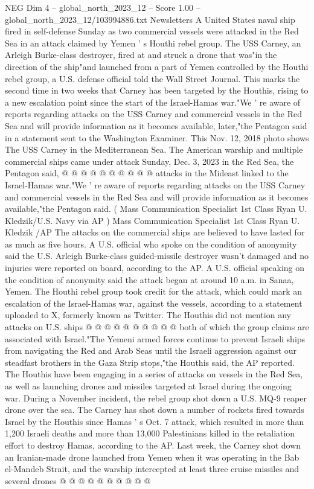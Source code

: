 \begin{textsample}{NEG Dim 4 – global\_north\_2023\_12 – Score 1.00 – global\_north\_2023\_12/103994886.txt}  \label{ex:f4_neg_160}
Newsletters A United States naval ship fired in self-defense Sunday as two commercial vessels were attacked in the Red Sea in an attack claimed by Yemen ' s Houthi rebel group.
The USS Carney, an Arleigh Burke-class destroyer, fired at and struck a drone that was"in the direction of the ship"and launched from a part of Yemen controlled by the Houthi rebel group, a U.S. defense official told the Wall Street Journal.
This marks the second time in two weeks that Carney has been targeted by the Houthis, rising to a new escalation point since the start of the Israel-Hamas war."We ' re aware of reports regarding attacks on the USS Carney and commercial vessels in the Red Sea and will provide information as it becomes available, later,"the Pentagon said in a statement sent to the Washington Examiner.
This Nov. 12, 2018 photo shows The USS Carney in the Mediterranean Sea.
The American warship and multiple commercial ships came under attack Sunday, Dec. 3, 2023 in the Red Sea, the Pentagon said, @ @ @ @ @ @ @ @ @ @ attacks in the Mideast linked to the Israel-Hamas war."We ' re aware of reports regarding attacks on the USS Carney and commercial vessels in the Red Sea and will provide information as it becomes available,"the Pentagon said. ( Mass Communication Specialist 1st Class Ryan U.
Kledzik/U.S.
Navy via AP ) Mass Communication Specialist 1st Class Ryan U.
Kledzik /AP The attacks on the commercial ships are believed to have lasted for as much as five hours.
A U.S. official who spoke on the condition of anonymity said the U.S.
Arleigh Burke-class guided-missile destroyer wasn't damaged and no injuries were reported on board, according to the AP.
A U.S. official speaking on the condition of anonymity said the attack began at around 10 a.m. in Sanaa, Yemen.
The Houthi rebel group took credit for the attack, which could mark an escalation of the Israel-Hamas war, against the vessels, according to a statement uploaded to X, formerly known as Twitter.
The Houthis did not mention any attacks on U.S. ships @ @ @ @ @ @ @ @ @ @ both of which the group claims are associated with Israel."The Yemeni armed forces continue to prevent Israeli ships from navigating the Red and Arab Seas until the Israeli aggression against our steadfast brothers in the Gaza Strip stops,"the Houthis said, the AP reported.
The Houthis have been engaging in a series of attacks on vessels in the Red Sea, as well as launching drones and missiles targeted at Israel during the ongoing war.
During a November incident, the rebel group shot down a U.S.
MQ-9 reaper drone over the sea.
The Carney has shot down a number of rockets fired towards Israel by the Houthis since Hamas ' s Oct. 7 attack, which resulted in more than 1,200 Israeli deaths and more than 13,000 Palestinians killed in the retaliation effort to destroy Hamas, according to the AP.
Last week, the Carney shot down an Iranian-made drone launched from Yemen when it was operating in the Bab el-Mandeb Strait, and the warship intercepted at least three cruise missiles and several drones @ @ @ @ @ @ @ @ @ @

\end{textsample}
